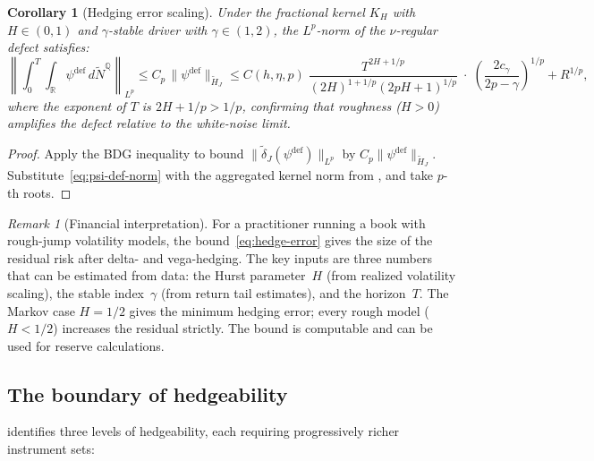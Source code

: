 \documentclass[11pt,a4paper]{article}
\theoremstyle{plain}
\newtheorem{corollary}[theorem]{Corollary}
\theoremstyle{definition}
\theoremstyle{remark}
\newtheorem{remark}[theorem]{Remark}
\newcommand{\R}{\mathbb{R}}
\newcommand{\QQ}{\mathbb{Q}}
\newcommand{\Ntilde}{\widetilde{N}}
\begin{document}
\begin{corollary}[Hedging error scaling]\label{cor:hedge-error}
Under the fractional kernel $K_H$ with $H \in (0,1)$ and
$\gamma$-stable driver with $\gamma \in (1,2)$, the
$L^p$-norm of the $\nu$-regular defect satisfies:
\begin{equation}\label{eq:hedge-error}
  \left\|\int_0^T\!\!\int_\R \psi^{\mathrm{def}}\,
  d\Ntilde^\QQ\right\|_{L^p}
  \leq C_p\,
  \|\psi^{\mathrm{def}}\|_{\widetilde{H}_J}
  \leq C(h,\eta,p)\;\frac{T^{2H + 1/p}}{(2H)^{1+1/p}
  (2pH+1)^{1/p}}
  \;\cdot\;\left(\frac{2c_\gamma}{2p - \gamma}\right)^{1/p}
  + R^{1/p},
\end{equation}
where the exponent of $T$ is $2H + 1/p > 1/p$, confirming that
roughness ($H > 0$) amplifies the defect relative to the
white-noise limit.
\end{corollary}

\begin{proof}
Apply the BDG inequality to bound
$\|\widetilde{\delta}_J(\psi^{\mathrm{def}})\|_{L^p}$
by $C_p\|\psi^{\mathrm{def}}\|_{\widetilde{H}_J}$.
Substitute~\eqref{eq:psi-def-norm} with the aggregated kernel
norm from , and take $p$-th roots.
\end{proof}

\begin{remark}[Financial interpretation]\label{rem:hedging-practical}
For a practitioner running a book with rough-jump volatility
models, the bound~\eqref{eq:hedge-error} gives the size of the
residual risk after delta- and vega-hedging.  The key inputs are
three numbers that can be estimated from data: the Hurst
parameter~$H$ (from realized volatility scaling), the stable
index~$\gamma$ (from return tail estimates), and the
horizon~$T$.  The Markov case $H = 1/2$ gives the minimum
hedging error; every rough model ($H < 1/2$) increases the
residual strictly.  The bound is computable and can be used for
reserve calculations.
\end{remark}


\subsection{The boundary of hedgeability}

 identifies three levels of
hedgeability, each requiring progressively richer
instrument sets:
\end{document}
